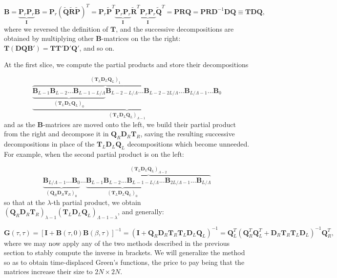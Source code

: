 \begin{equation}
\bm B = \underbrace{\bm P_r \bm P_r}_{\bm I} \bm B = \bm P_r ( \tilde{\bm Q} \tilde{\bm R} \tilde{\bm P} )^T =  \bm P_r \tilde{\bm P}^T \underbrace{\bm P_r \bm P_r}_{\bm I} \tilde{\bm R}^T \underbrace{\bm P_r \bm P_r}_{\bm I} \tilde{\bm Q}^T = \bm P \bm R \bm Q = \bm P \bm R \bm D^{-1} \bm D \bm Q \equiv \bm T \bm D \bm Q ,
\end{equation}
where we reversed the definition of $\bm T$, and the successive decompositions are obtained by multiplying other $\bm B$-matrices on the the right: $\bm T (\bm D \bm Q \bm B') = \bm T \bm T' \bm D' \bm Q'$, and so on.

At the first slice, we compute the partial products and store their decompositions

\begin{equation}
\underbrace{ \overbrace{ \underbrace{\bm B_{L - 1} \bm B_{L-2} ... \bm B_{L - 1- L / \Lambda}}_{(\bm T_L \bm D_L \bm Q_L)_{0} }  \bm B_{L - 2 - L / \Lambda} ...\bm B_{L - 2 - 2 L / \Lambda} }^{(\bm T_L \bm D_L \bm Q_L)_{1}} ... \bm B_{L / \Lambda - 1} ...  \bm B_0}_{(\bm T_L \bm D_L \bm Q_L)_{\Lambda - 1}}
\end{equation}
and as the $\bm B$-matrices are moved onto the left, we build their partial product from the right and decompose it in $\bm Q_R \bm D_R \bm T_R$, saving the resulting successive decompositions in place of the $\bm T_L \bm D_L \bm Q_L$ decompositions which become unneeded.
For example, when the second partial product is on the left:

\begin{equation}
\underbrace{\bm B_{L / \Lambda - 1} ...  \bm B_0}_{(\bm Q_R \bm D_R \bm T_R)_{0}} ... \overbrace{ \underbrace{\bm B_{L - 1} \bm B_{L-2} ... \bm B_{L - 1- L / \Lambda}}_{(\bm T_L \bm D_L \bm Q_L)_{0} } ...  \bm B_{2 L / \Lambda -1} ...\bm B_{L / \Lambda} }^{(\bm T_L \bm D_L \bm Q_L)_{\Lambda - 2}} 
\end{equation}
so that at the $\lambda$-th partial product, we obtain $(\bm Q_R \bm D_R \bm T_R )_{\lambda -1} (\bm T_L \bm D_L \bm Q_L )_{\Lambda - 1 - \lambda}$, and generally:

\begin{equation}
\bm G ( \tau, \tau ) = [\bm I + \bm B ( \tau, 0 ) \bm B ( \beta, \tau ) ]^{-1} = ( \bm I + \bm Q_R \bm D_R \bm T_R \bm T_L \bm D_L \bm Q_L )^{-1} = \bm Q_L^T ( \bm Q_R^T \bm Q_L^T + \bm D_R \bm T_R \bm T_L \bm D_L )^{-1} \bm Q_R^T ,
\end{equation}
where we may now apply any of the two methods described in the previous section to stably compute the inverse in brackets.
We will generalize the  method so as to obtain time-displaced Green's functions, the price to pay being that the matrices increase their size to $2 N \times 2 N$.

